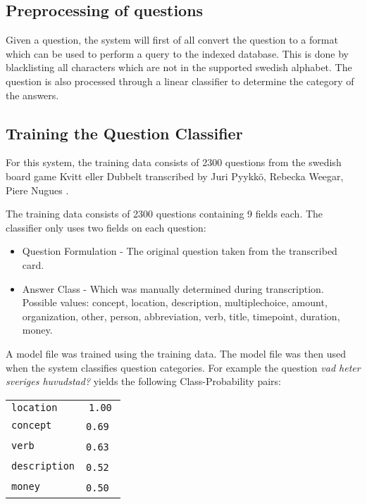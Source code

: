 \subsection{Preprocessing of questions}
Given a question, the system will first of all convert the question
to a format which can be used to perform a query to the indexed
database. This is done by blacklisting all characters which
are not in the supported swedish alphabet. The question is also
processed through a linear classifier to determine the category of the 
answers.

\subsection{Training the Question Classifier}
For this system, the training data consists of 2300 questions 
from the swedish board game Kvitt eller Dubbelt transcribed 
by Juri Pyykk\"o, Rebecka Weegar, Piere Nugues \cite{QASYS}.

The training data consists of 2300 questions containing 9 fields each.
The classifier only uses two fields on each question:
\begin{itemize}
\item Question Formulation - The original question taken from the transcribed
  card.
\item Answer Class - Which was manually determined during transcription. 
  Possible values: concept, location, description, multiplechoice, amount, organization, 
  other, person, abbreviation, verb, title, timepoint, duration, money.
\end{itemize}
A model file was trained using the training data. The model file was then used when the system 
classifies question categories. For example the question \textit{vad heter sveriges huvudstad?} 
yields the following Class-Probability pairs:
\begin{center}
  \begin{tabular} {l c}
    \texttt{location}    & \texttt{1.00} \\
    \texttt{concept}     & \texttt{0.69} \\
    \texttt{verb}        & \texttt{0.63} \\
    \texttt{description} & \texttt{0.52} \\
    \texttt{money}       & \texttt{0.50} \\
  \end{tabular}
\end{center}
